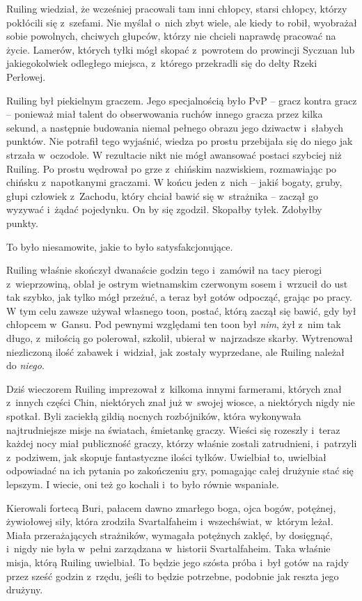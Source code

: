 \documentclass[oneside,polish,11pt,rmheadings]{mwbk}
\begin{document}
Ruiling wiedział, że wcześniej pracowali tam inni chłopcy, starsi chłopcy, którzy pokłócili się z~szefami. Nie myślał o~nich zbyt wiele, ale kiedy to robił, wyobrażał sobie powolnych, chciwych głupców, którzy nie chcieli naprawdę pracować na życie. Lamerów, których tyłki mógł skopać z~powrotem do prowincji Syczuan lub jakiegokolwiek odległego miejsca, z~którego przekradli się do delty Rzeki Perłowej.

Ruiling był piekielnym graczem. Jego specjalnością było PvP -- gracz kontra gracz -- ponieważ miał talent do obserwowania ruchów innego gracza przez kilka sekund, a następnie budowania niemal pełnego obrazu jego dziwactw i~słabych punktów. Nie potrafił tego wyjaśnić, wiedza po prostu przebijała się do niego jak strzała w~oczodole. W rezultacie nikt nie mógł awansować postaci szybciej niż Ruiling. Po prostu wędrował po grze z~chińskim nazwiskiem, rozmawiając po chińsku z~napotkanymi graczami. W końcu jeden z~nich -- jakiś bogaty, gruby, głupi człowiek z~Zachodu, który chciał bawić się w~strażnika -- zaczął go wyzywać i~żądać pojedynku. On by się zgodził. Skopałby tyłek. Zdobyłby punkty.

To było niesamowite, jakie to było satysfakcjonujące.

Ruiling właśnie skończył dwanaście godzin tego i~zamówił na tacy pierogi z~wieprzowiną, oblał je ostrym wietnamskim czerwonym sosem i~wrzucił do ust tak szybko, jak tylko mógł przeżuć, a teraz był gotów odpocząć, grając po pracy. W tym celu zawsze używał własnego toon, postać, którą zaczął się bawić, gdy był chłopcem w~Gansu. Pod pewnymi względami ten toon był \textit{nim}, żył z~nim tak długo, z~miłością go polerował, szkolił, ubierał w~najrzadsze skarby. Wytrenował niezliczoną ilość zabawek i~widział, jak zostały wyprzedane, ale Ruiling należał do \textit{niego}.

Dziś wieczorem Ruiling imprezował z~kilkoma innymi farmerami, których znał z~innych części Chin, niektórych znał już w~swojej wiosce, a niektórych nigdy nie spotkał. Byli zaciekłą gildią nocnych rozbójników, która wykonywała najtrudniejsze misje na światach, śmietankę graczy. Wieści się rozeszły i~teraz każdej nocy miał publiczność graczy, którzy właśnie zostali zatrudnieni, i~patrzyli z~podziwem, jak skopuje fantastyczne ilości tyłków. Uwielbiał to, uwielbiał odpowiadać na ich pytania po zakończeniu gry, pomagając całej drużynie stać się lepszym. I wiecie, oni też go kochali i~to było równie wspaniałe.

Kierowali fortecą Buri, pałacem dawno zmarłego boga, ojca bogów, potężnej, żywiołowej siły, która zrodziła Svartalfaheim i~wszechświat, w~którym leżał. Miała przerażających strażników, wymagała potężnych zaklęć, by dosięgnąć, i~nigdy nie była w~pełni zarządzana w~historii Svartalfaheim. Taka właśnie misja, którą Ruiling uwielbiał. To będzie jego szósta próba i~był gotów na rajdy przez sześć godzin z~rzędu, jeśli to będzie potrzebne, podobnie jak reszta jego drużyny.
\end{document}
